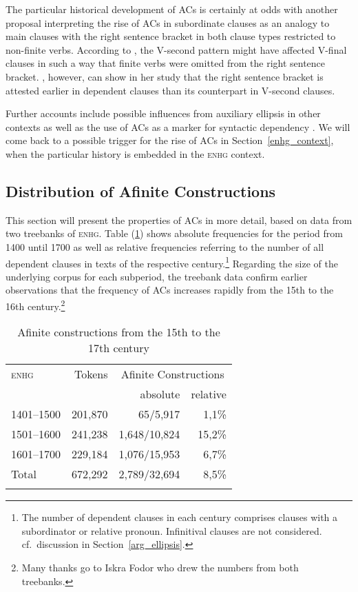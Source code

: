 \documentclass[output=paper,colorlinks,citecolor=brown]{langscibook}
\begin{document}
The particular historical development of ACs is certainly at odds with another proposal interpreting the rise of ACs in subordinate clauses as an analogy to main clauses with the right sentence bracket in both clause types restricted to non-finite verbs. According to \citet{bock75}, the V-second pattern might have affected V-final clauses in such a way that finite verbs were omitted from the right sentence bracket. \citet{breitbarth2005}, however, can show in her study that the right sentence bracket is attested earlier in dependent clauses than its counterpart in V-second clauses. 

Further accounts include possible influences from auxiliary ellipsis in other contexts \citep{behaghel28,bock75,schroeder85} as well as the use of ACs as a marker for syntactic dependency \citep{admoni67,breitbarth2005,demske90}. We will come back to a possible trigger for the rise of ACs in Section~\ref{enhg_context}, when the particular history is embedded in the \textsc{enhg} context. 

\subsection{Distribution of Afinite Constructions \label{distribution}}
This section will present the properties of ACs in more detail, based on data from two treebanks of \textsc{enhg}. Table (\ref{table1}) shows absolute frequencies for the period from 1400 until 1700 as well as relative frequencies referring to the number of all dependent clauses in texts of the respective century.\footnote{The number of dependent clauses in each century comprises clauses with a subordinator or relative pronoun. Infinitival clauses are not considered. cf.\ discussion in Section~\ref{arg_ellipsis}.} Regarding the size of the underlying corpus for each subperiod, the treebank data confirm earlier observations that the frequency of ACs increases rapidly from the 15th to the 16th century.\footnote{Many thanks go to Iskra Fodor who drew the numbers from both treebanks.}  
\begin{table} 
  \centering
  \begin{tabular}{lrrr}
    \lsptoprule
   \textsc{enhg} & Tokens & \multicolumn{2}{c}{Afinite Constructions} \\
   & & absolute & relative \\
    \midrule
    1401--1500 & 201,870 & 65/5,917 & 1,1\% \\
    1501--1600 & 241,238 & 1,648/10,824 & 15,2\% \\
    1601--1700 & 229,184 & 1,076/15,953 & 6,7\% \\
     \midrule
    Total & 672,292 & 2,789/32,694 & 8,5\% \\
      \lspbottomrule
    \end{tabular}
   \caption{Afinite constructions from the 15th to the 17th century \label{table1}}
\end{table}
\end{document}
